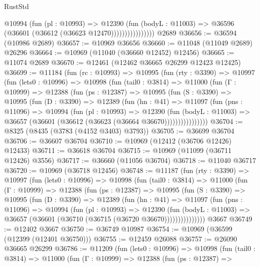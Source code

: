\begin{lexlean}{RustStd}
\begin{coremodule}
                        @10994
                          (fun (pl : @10993) =>
                          @12390
                            (fun (bodyL : @11003) =>
                            @36596 (@36601 (@36612 (@36623 @12470))))))))))))))))
    @2689
@36656 := @36594 (@10986 @2689)
@36657 := @10969 @36656
@36660 := @11048 (@11049 @2689) @26296
@36664 := @10969 (@11040 (@36660 @12452) @12456)
@36665 := @11074 @2689
@36670 := @12461 (@12462 @36665 @26299 @12423 @12425)
@36699 := @11184
    (fun (rc : @10993) =>
    @10995
      (fun (rty : @3390) =>
      @10997
        (fun (lets0 : @10996) =>
        @10998
          (fun (tail0 : @3814) =>
          @11000
            (fun (Γ : @10999) =>
            @12388
              (fun (ps : @12387) =>
              @10995
                (fun (S : @3390) =>
                @10995
                  (fun (D : @3390) =>
                  @12389
                    (fun (hn : @41) =>
                    @11097
                      (fun (pns : @11096) =>
                      @10994
                        (fun (pl : @10993) =>
                        @12390
                          (fun (bodyL : @11003) =>
                          @36657 (@36601 (@36612 (@36623 (@36664 @36670))))))))))))))))
@36704 := @8325 (@8435 (@3783 (@4152 @3403) @3793))
@36705 := @36699 @36704
@36706 := @36607 @36704
@36710 := @10969 (@12412 (@36706 @12426) @12433)
@36711 := @36618 @36704
@36715 := @10969 (@11099 (@36711 @12426) @3556)
@36717 := @36660 (@11056 @36704)
@36718 := @11040 @36717
@36720 := @10969 (@36718 @12456)
@36748 := @11187
    (fun (rty : @3390) =>
    @10997
      (fun (lets0 : @10996) =>
      @10998
        (fun (tail0 : @3814) =>
        @11000
          (fun (Γ : @10999) =>
          @12388
            (fun (ps : @12387) =>
            @10995
              (fun (S : @3390) =>
              @10995
                (fun (D : @3390) =>
                @12389
                  (fun (hn : @41) =>
                  @11097
                    (fun (pns : @11096) =>
                    @10994
                      (fun (pl : @10993) =>
                      @12390
                        (fun (bodyL : @11003) =>
                        @36657 (@36601 (@36710 (@36715 (@36720 @36670)))))))))))))))
    @3667
@36749 := @12402 @3667
@36750 := @36749 @10987
@36754 := @10969 (@36599 (@12399 (@12401 @36750)))
@36755 := @12459 @26088
@36757 := @26090 @36665 @26299
@36786 := @11209
    (fun (lets0 : @10996) =>
    @10998
      (fun (tail0 : @3814) =>
      @11000
        (fun (Γ : @10999) =>
        @12388
          (fun (ps : @12387) =>

\end{coremodule}
\end{lexlean}
